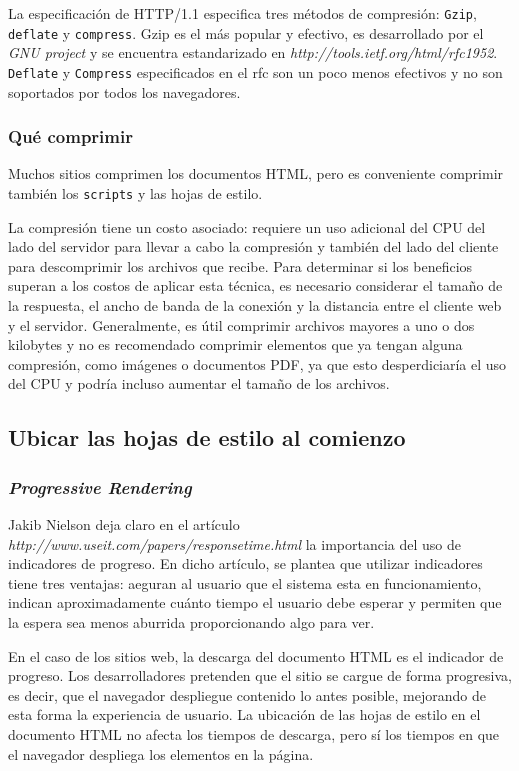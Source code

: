 \documentclass[a4paper,12pt]{report}
\begin{document}
La especificación de HTTP/1.1 especifica tres métodos de compresión: \texttt{Gzip}, \texttt{deflate} y \texttt{compress}. Gzip es el más popular y efectivo, es
desarrollado por el \emph{GNU project} y se encuentra estandarizado en \emph{http://tools.ietf.org/html/rfc1952}. \texttt{Deflate} y
\texttt{Compress} especificados en el rfc \cite{rfc1950} son un poco menos efectivos y no son soportados por todos los navegadores.

\subsubsection{Qué comprimir}

Muchos sitios comprimen los documentos HTML, pero es conveniente comprimir también los \texttt{scripts} y las hojas de estilo.

La compresión tiene un costo asociado: requiere un uso adicional del CPU del lado del servidor para llevar a cabo la compresión y también del lado del cliente
para descomprimir los archivos que recibe. Para determinar si los beneficios superan a los costos de aplicar esta técnica, es necesario considerar el tamaño de la respuesta, el
ancho de banda de la conexión y la distancia entre el cliente web y el servidor. Generalmente, es útil comprimir archivos mayores a uno o dos kilobytes y no es recomendado comprimir elementos
que ya tengan alguna compresión, como imágenes o documentos PDF, ya que esto desperdiciaría el uso del CPU y podría incluso aumentar el tamaño de los archivos.

\subsection{Ubicar las hojas de estilo al comienzo}

\subsubsection{\emph{Progressive Rendering}}

Jakib Nielson deja claro en el artículo \emph{http://www.useit.com/papers/responsetime.html} la importancia del uso de indicadores de progreso.
En dicho artículo, se plantea que utilizar indicadores tiene tres ventajas: aeguran al usuario que el sistema esta en funcionamiento, indican aproximadamente cuánto tiempo el usuario debe esperar y
permiten que la espera sea menos aburrida proporcionando algo para ver.

En el caso de los sitios web, la descarga del documento HTML es el indicador de progreso. Los desarrolladores pretenden que el sitio se cargue de forma progresiva, es decir, que el
navegador despliegue contenido lo antes posible, mejorando de esta forma la experiencia de usuario. La ubicación de las hojas de estilo en el documento HTML no afecta
los tiempos de descarga, pero sí los tiempos en que el navegador despliega los elementos en la página.
\end{document}
